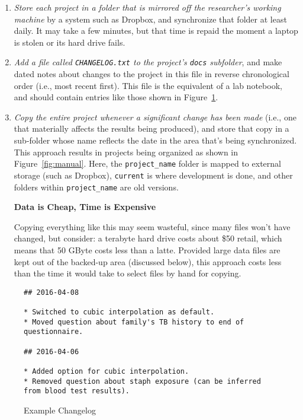 \documentclass[10pt]{article}
\newcommand{\recommend}[1]{\textit{#1}}
\begin{document}
\begin{enumerate}

\item
  \recommend{Store each project in a folder that is mirrored off the
    researcher's working machine} by a system such as Dropbox, and
  synchronize that folder at least daily. It may take a few minutes,
  but that time is repaid the
  moment a laptop is stolen or its hard drive fails.

\item
  \recommend{Add a file called \texttt{CHANGELOG.txt} to the project's
    \texttt{docs} subfolder}, and make dated notes about changes to
  the project in this file in reverse chronological order (i.e., most
  recent first). This file is the equivalent of a lab notebook, and
  should contain entries like those shown in
  Figure~\ref{fig:changelog}.

\item
  \recommend{Copy the entire project whenever a significant change has
    been made} (i.e., one that materially affects the results being
  produced), and store that copy in a sub-folder whose name reflects
  the date in the area that's being synchronized. This approach
  results in projects being organized as shown in
  Figure~\ref{fig:manual}.  Here, the \texttt{project\_name} folder is
  mapped to external storage (such as Dropbox), \texttt{current} is
  where development is done, and other folders within
  \texttt{project\_name} are old versions.

  \begin{framed}
    \noindent \textbf{Data is Cheap, Time is Expensive}

    Copying everything like this may seem wasteful, since many files
    won't have changed, but consider: a terabyte hard drive costs
    about \$50 retail, which means that 50 GByte costs less than a
    latte. Provided large data files are kept out of the backed-up
    area (discussed below), this approach costs less than the time it
    would take to select files by hand for copying.
  \end{framed}

\end{enumerate}

\begin{figure}
\begin{verbatim}
## 2016-04-08

* Switched to cubic interpolation as default.
* Moved question about family's TB history to end of questionnaire.

## 2016-04-06

* Added option for cubic interpolation.
* Removed question about staph exposure (can be inferred from blood test results).
\end{verbatim}
\caption{Example Changelog}
\label{fig:changelog}
\end{figure}
\end{document}
